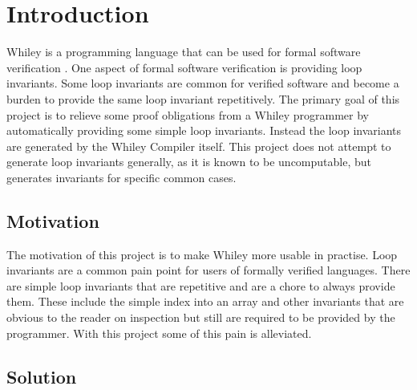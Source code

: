 \chapter{Introduction}\label{C:intro}
%
%

Whiley is a programming language that can be used for formal software
verification \cite{whiley-origin}.
One aspect of formal software verification is providing loop
invariants.
Some loop invariants are common for verified software and become a burden to
provide the same loop invariant repetitively.
The primary goal of this project is to relieve some proof obligations from a
Whiley programmer by automatically providing some simple loop invariants.
Instead the loop invariants are generated by the Whiley Compiler itself.
This project does not attempt to generate loop invariants generally, as it is
known to be uncomputable, but generates invariants for specific common cases.

\section{Motivation}

The motivation of this project is to make Whiley more usable in practise.
Loop invariants are a common pain point for users of formally verified
languages.
There are simple loop invariants that are repetitive and are a chore to
always provide them.
These include the simple index into an array and other invariants that
are obvious to the reader on inspection but still are required to be
provided by the programmer.
With this project some of this pain is alleviated.


\section{Solution}


